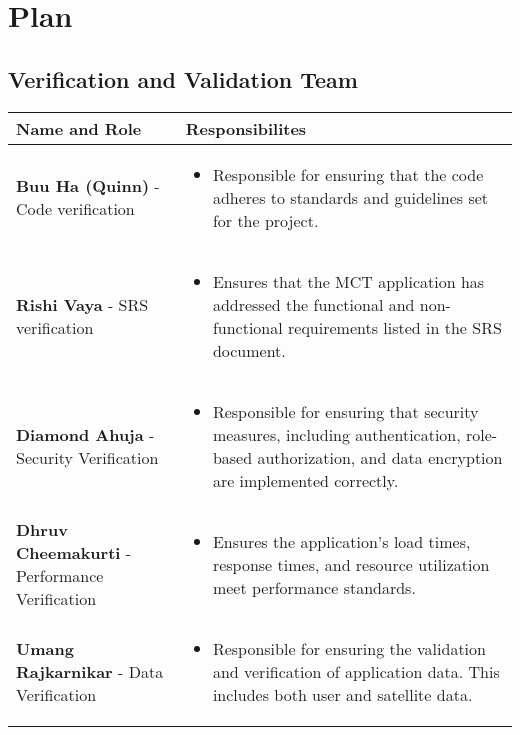 \documentclass[12pt, titlepage]{article}
\begin{document}
\section{Plan}
\subsection{Verification and Validation Team}
\setlength{\arrayrulewidth}{0.5mm}
\setlength{\tabcolsep}{18pt}
\renewcommand{\arraystretch}{1.5}
\begin{tabular}{ | m{5cm} | m{8cm} | } 
\hline
  \textbf{Name and Role} & \textbf{Responsibilites} \\ 
  \hline
    \textbf{Buu Ha (Quinn)} - Code verification & \begin{itemize}
	\item Responsible for ensuring that the code adheres to standards and guidelines set for the project.
	
\end{itemize}\\ 
  \hline
   \textbf{Rishi Vaya} - SRS verification & \begin{itemize}
	\item Ensures that the MCT application has addressed the functional and non-functional requirements listed in the SRS document.
       
\end{itemize}\\ 
  \hline
    \textbf{Diamond Ahuja} - Security Verification & \begin{itemize}
	\item Responsible for ensuring that security measures, including authentication, role-based authorization, and data encryption are implemented correctly.
\end{itemize}\\ 
  \hline
   \textbf{Dhruv Cheemakurti} - Performance Verification & \begin{itemize}
	\item Ensures the application’s load times, response times, and resource utilization meet performance standards.
\end{itemize}\\ 
  \hline
    \textbf{Umang Rajkarnikar} - Data Verification & \begin{itemize}
	\item Responsible for ensuring the validation and verification of application data. This includes both user and satellite data.
\end{itemize}\\ 
  \hline

\end{tabular}
\end{document}

